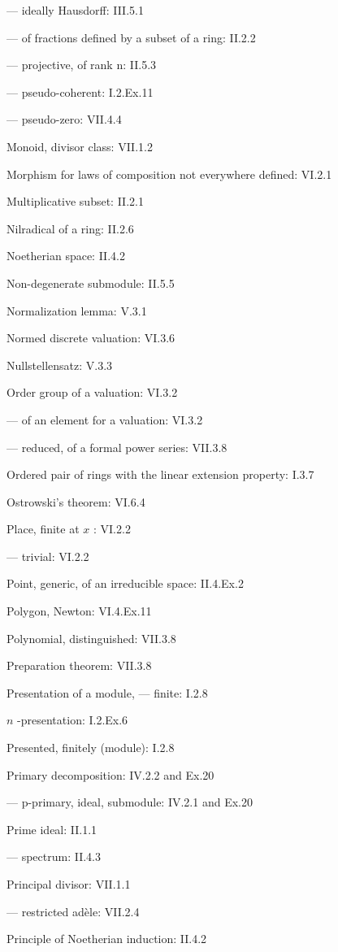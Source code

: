 --- ideally Hausdorff: III.5.1

--- of fractions defined by a subset of a ring: II.2.2

--- projective, of rank n: II.5.3

--- pseudo-coherent: I.2.Ex.11

--- pseudo-zero: VII.4.4

Monoid, divisor class: VII.1.2

Morphism for laws of composition not everywhere defined: VI.2.1

Multiplicative subset: II.2.1

Nilradical of a ring: II.2.6

Noetherian space: II.4.2

Non-degenerate submodule: II.5.5

Normalization lemma: V.3.1

Normed discrete valuation: VI.3.6

Nullstellensatz: V.3.3

Order group of a valuation: VI.3.2

--- of an element for a valuation: VI.3.2

--- reduced, of a formal power series: VII.3.8

Ordered pair of rings with the linear extension property: I.3.7

Ostrowski's theorem: VI.6.4

Place, finite at \(x\) : VI.2.2

--- trivial: VI.2.2

Point, generic, of an irreducible space: II.4.Ex.2

Polygon, Newton: VI.4.Ex.11

Polynomial, distinguished: VII.3.8

Preparation theorem: VII.3.8

Presentation of a module, --- finite: I.2.8

\(n\) -presentation: I.2.Ex.6

Presented, finitely (module): I.2.8

Primary decomposition: IV.2.2 and Ex.20

--- p-primary, ideal, submodule: IV.2.1 and Ex.20

Prime ideal: II.1.1

--- spectrum: II.4.3

Principal divisor: VII.1.1

--- restricted adèle: VII.2.4

Principle of Noetherian induction: II.4.2

